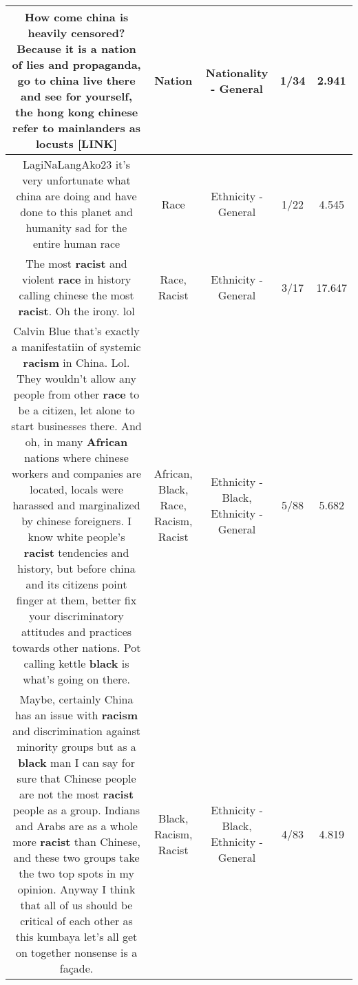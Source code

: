 \documentclass[11pt]{article}
\newlength\mylength
\begin{document}
\begin{center}
\begin{longtable}{|C{.65\mylength}|C{.30\mylength}|C{.12\mylength}|C{.12\mylength}|C{.12\mylength}|}
  \small How come china is heavily censored? Because it is a \textbf{nation} of lies and propaganda, go to china live there and see for yourself, the hong kong chinese refer to mainlanders as locusts  [LINK] \normalsize   & Nation & Nationality - General & 1/34 & 2.941 \\  \hline
  \small LagiNaLangAko23 it's very unfortunate what china are doing and have done to this planet and humanity sad for the entire human race\normalsize   & Race & Ethnicity - General & 1/22 & 4.545 \\  \hline
  \small The most \textbf{racist} and violent \textbf{race} in history calling chinese the most \textbf{racist}. Oh the irony. lol\normalsize   & Race, Racist & Ethnicity - General & 3/17 & 17.647 \\  \hline
  \small Calvin Blue that's exactly a manifestatiin of systemic \textbf{racism} in China. Lol. They wouldn't allow any people from other \textbf{race} to be a citizen, let alone to start businesses there. And oh, in many \textbf{African} nations where chinese workers and companies are located, locals were harassed and marginalized by chinese foreigners. I know white people's \textbf{racist} tendencies and history, but before china and its citizens point finger at them, better fix your discriminatory attitudes and practices towards other nations. Pot calling kettle \textbf{black} is what's going on there.\normalsize   & African, Black, Race, Racism, Racist & Ethnicity - Black, Ethnicity - General & 5/88 & 5.682 \\  \hline
  \small Maybe, certainly China has an issue with \textbf{racism} and discrimination against minority groups but as a \textbf{black} man I can say for sure that Chinese people are not the most \textbf{racist} people as a group. Indians and Arabs are as a whole more \textbf{racist} than Chinese, and these two groups take the two top spots in my opinion. Anyway I think that all of us should be critical of each other as this kumbaya let's all get on together nonsense is a façade.\normalsize   & Black, Racism, Racist & Ethnicity - Black, Ethnicity - General & 4/83 & 4.819 \\  \hline

\end{longtable}
\end{center}
\end{document}
